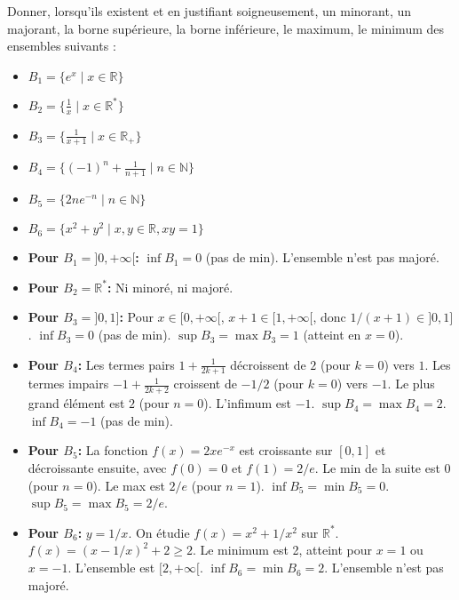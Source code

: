 \documentclass[solutions]{exercices}
\begin{document}
\begin{exercice}[\di]
Donner, lorsqu'ils existent et en justifiant soigneusement, un minorant, un majorant, la borne supérieure, la borne inférieure, le maximum, le minimum des ensembles suivants :
\begin{multicols}{2}
	\begin{itemize}
		\item $B_1 = \{e^x \mid x \in \mathbb{R}\}$
		\item $B_2 = \{\frac{1}{x} \mid x \in \mathbb{R}^*\}$
		\item $B_3 = \{\frac{1}{x+1} \mid x \in \mathbb{R}_+\}$
		\item $B_4 = \{(-1)^n + \frac{1}{n+1} \mid n \in \mathbb{N}\}$
		\item $B_5 = \{2ne^{-n} \mid n \in \mathbb{N}\}$
		\item $B_6 = \{x^2+y^2 \mid x, y \in \mathbb{R}, xy=1\}$
	\end{itemize}
\end{multicols}
\end{exercice}

\begin{solution}
	\begin{itemize}
		\item \textbf{Pour $B_1 = ]0, +\infty[$:} $\inf B_1 = 0$ (pas de min). L'ensemble n'est pas majoré.
		\item \textbf{Pour $B_2 = \mathbb{R}^*$:} Ni minoré, ni majoré.
		\item \textbf{Pour $B_3 = ]0, 1]$:} Pour $x \in [0, +\infty[$, $x+1 \in [1, +\infty[$, donc $1/(x+1) \in ]0, 1]$. $\inf B_3 = 0$ (pas de min). $\sup B_3 = \max B_3 = 1$ (atteint en $x=0$).
		\item \textbf{Pour $B_4$:} Les termes pairs $1+\frac{1}{2k+1}$ décroissent de $2$ (pour $k=0$) vers $1$. Les termes impairs $-1+\frac{1}{2k+2}$ croissent de $-1/2$ (pour $k=0$) vers $-1$. Le plus grand élément est $2$ (pour $n=0$). L'infimum est $-1$. $\sup B_4 = \max B_4 = 2$. $\inf B_4 = -1$ (pas de min).
		\item \textbf{Pour $B_5$:} La fonction $f(x)=2xe^{-x}$ est croissante sur $[0,1]$ et décroissante ensuite, avec $f(0)=0$ et $f(1)=2/e$. Le min de la suite est $0$ (pour $n=0$). Le max est $2/e$ (pour $n=1$). $\inf B_5 = \min B_5 = 0$. $\sup B_5 = \max B_5 = 2/e$.
		\item \textbf{Pour $B_6$:} $y=1/x$. On étudie $f(x)=x^2+1/x^2$ sur $\mathbb{R}^*$. $f(x) = (x-1/x)^2 + 2 \ge 2$. Le minimum est 2, atteint pour $x=1$ ou $x=-1$. L'ensemble est $[2, +\infty[$. $\inf B_6 = \min B_6 = 2$. L'ensemble n'est pas majoré.
	\end{itemize}
\end{solution}
\end{document}
